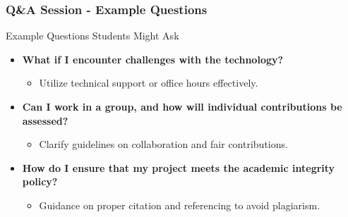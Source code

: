 \documentclass[aspectratio=169]{beamer}
\begin{document}
\begin{frame}[fragile]
    \frametitle{Q\&A Session - Example Questions}
    \begin{block}{Example Questions Students Might Ask}
        \begin{itemize}
            \item \textbf{What if I encounter challenges with the technology?}
                \begin{itemize}
                    \item Utilize technical support or office hours effectively.
                \end{itemize}
                
            \item \textbf{Can I work in a group, and how will individual contributions be assessed?}
                \begin{itemize}
                    \item Clarify guidelines on collaboration and fair contributions.
                \end{itemize}
                
            \item \textbf{How do I ensure that my project meets the academic integrity policy?}
                \begin{itemize}
                    \item Guidance on proper citation and referencing to avoid plagiarism.
                \end{itemize}
        \end{itemize}
    \end{block}
\end{frame}
\end{document}
